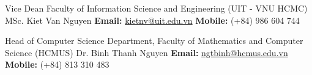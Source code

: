 

\begin{cventries}

  \cventry
    {Vice Dean Faculty of Information Science and Engineering (UIT - VNU HCMC)} %
    {MSc. Kiet Van Nguyen} %
    {} %
    {} %
    {\textbf{Email:} \href{mailto:kietnv@uit.edu.vn}{kietnv@uit.edu.vn} \quad\quad\quad
    \textbf{Mobile:} (+84) 986 604 744}
    
  \cventry
    {Head of Computer Science Department, Faculty of Mathematics and Computer Science (HCMUS)} %
    {Dr. Binh Thanh Nguyen} %
    {} %
    {} %
    {\textbf{Email:} \href{mailto:ngtbinh@hcmus.edu.vn}{ngtbinh@hcmus.edu.vn}\quad
    \textbf{Mobile:} (+84) 813 310 483}

\end{cventries}
